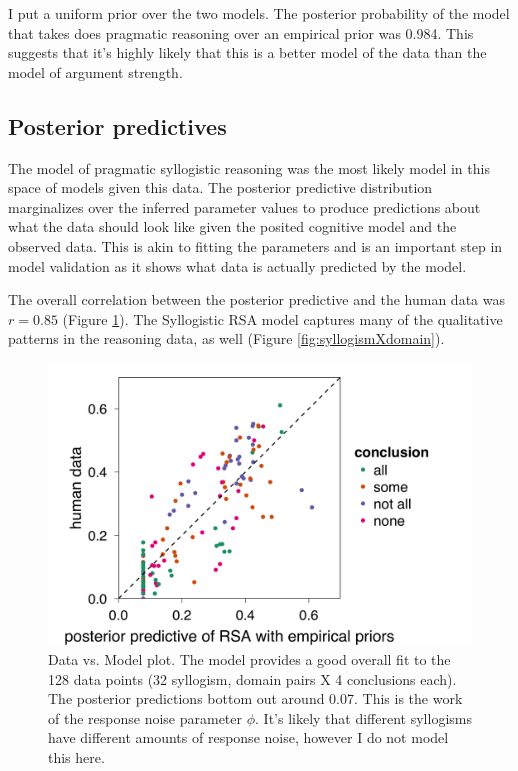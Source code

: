 \documentclass{article} %
\begin{document}
I put a uniform prior over the two models. The posterior probability of the model that takes does pragmatic reasoning over an empirical prior was 0.984. This suggests that it's highly likely that this is a better model of the data than the model of argument strength. 

\subsection{Posterior predictives}

The model of pragmatic syllogistic reasoning was the most likely model in this space of models given this data. The posterior predictive distribution marginalizes over the inferred parameter values to produce predictions about what the data should look like given the posited cognitive model and the observed data. This is akin to fitting the parameters and is an important step in model validation as it shows what data is actually predicted by the model.

The overall correlation between the posterior predictive and the human data was $r = 0.85$ (Figure \ref{fig:scatterplot}). The Syllogistic RSA model captures many of the qualitative patterns in the reasoning data, as well (Figure \ref{fig:syllogismXdomain}). 

\begin{figure}
\centering
    \includegraphics[width=0.5\columnwidth]{figures/scatterplot}
    \caption{Data vs. Model plot. The model provides a good overall fit to the 128 data points (32 syllogism, domain pairs X 4 conclusions each). The posterior predictions bottom out around 0.07. This is the work of the response noise parameter $\phi$. It's likely that different syllogisms have different amounts of response noise, however I do not model this here.}
  \label{fig:scatterplot}
\end{figure}
\end{document}

